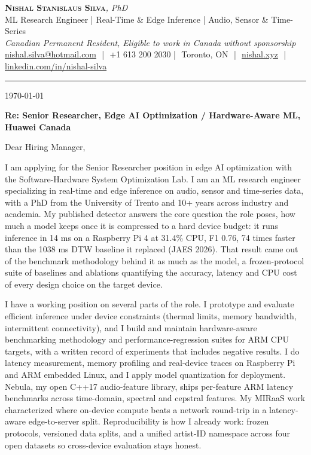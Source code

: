 \documentclass[11pt]{article}
\makeatletter
\newcommand{\clName}{Nishal Stanislaus Silva}
\newcommand{\clEmail}{nishal.silva@hotmail.com}
\newcommand{\clPhone}{+1 613 200 2030}
\newcommand{\clCity}{Toronto, ON}
\newcommand{\clSite}{https://nishal.xyz}
\newcommand{\clLinkedIn}{https://www.linkedin.com/in/nishal-silva}
\newcommand{\clStatus}{Canadian Permanent Resident, Eligible to work in Canada without sponsorship}
\newcommand{\clTagline}{ML Research Engineer | Real-Time \& Edge Inference | Audio, Sensor \& Time-Series}
\newcommand{\clRole}{Senior Researcher, Edge AI Optimization / Hardware-Aware ML}
\newcommand{\clCompany}{Huawei Canada}
\newcommand{\clAddressee}{Dear Hiring Manager,}
\makeatother
\begin{document}
\pagestyle{empty}
\begin{center}
    {\LARGE \scshape \textbf{\clName}}{\large \textit{, PhD}}\\[1pt]
    {\small \clTagline}\\[1pt]
    {\footnotesize\textit{\clStatus}}\\[1pt]
    {\small
    \href{mailto:\clEmail}{\clEmail} \,\,|\,\, \clPhone \,\,|\,\, \clCity
    \,\,|\,\, \href{\clSite}{nishal.xyz} \,\,|\,\, \href{\clLinkedIn}{linkedin.com/in/nishal-silva}}
\end{center}

\rule{\linewidth}{0.4pt}\vspace{0.6em}

\today

\textbf{Re: \clRole{}, \clCompany{}}

\clAddressee

I am applying for the Senior Researcher position in edge AI optimization with the Software-Hardware System Optimization Lab. I am an ML research engineer specializing in real-time and edge inference on audio, sensor and time-series data, with a PhD from the University of Trento and 10+ years across industry and academia. My published detector answers the core question the role poses, how much a model keeps once it is compressed to a hard device budget: it runs inference in 14 ms on a Raspberry Pi 4 at 31.4\% CPU, F1 0.76, 74 times faster than the 1038 ms DTW baseline it replaced (JAES 2026). That result came out of the benchmark methodology behind it as much as the model, a frozen-protocol suite of baselines and ablations quantifying the accuracy, latency and CPU cost of every design choice on the target device.

I have a working position on several parts of the role. I prototype and evaluate efficient inference under device constraints (thermal limits, memory bandwidth, intermittent connectivity), and I build and maintain hardware-aware benchmarking methodology and performance-regression suites for ARM CPU targets, with a written record of experiments that includes negative results. I do latency measurement, memory profiling and real-device traces on Raspberry Pi and ARM embedded Linux, and I apply model quantization for deployment. Nebula, my open C++17 audio-feature library, ships per-feature ARM latency benchmarks across time-domain, spectral and cepstral features. My MIRaaS work characterized where on-device compute beats a network round-trip in a latency-aware edge-to-server split. Reproducibility is how I already work: frozen protocols, versioned data splits, and a unified artist-ID namespace across four open datasets so cross-device evaluation stays honest.
\end{document}
